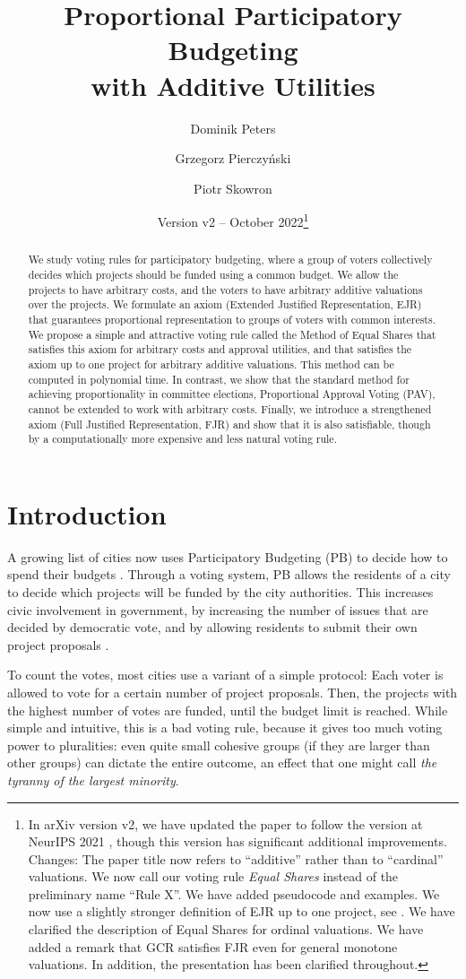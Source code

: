 \documentclass[10pt]{scrartcl}
\title{{\huge\sffamily Proportional Participatory Budgeting \\ with Additive Utilities}}
\author[1]{Dominik Peters}
\author[2]{Grzegorz Pierczy\'{n}ski}
\author[2]{Piotr Skowron}
\affil[1]{CNRS, LAMSADE, Universit\'e Paris Dauphine--PSL, \texttt{dominik.peters@lamsade.dauphine.fr}}
\affil[2]{University of Warsaw, $\{$\texttt{g.pierczynski,p.skowron}$\}$\texttt{@mimuw.edu.pl}}
\date{Version v2 -- October 2022\thanks{In arXiv version v2, we have updated the paper to follow the version at NeurIPS 2021 \citep{peters2021neurips}, though this version has significant additional improvements. Changes: The paper title now refers to ``additive'' rather than to ``cardinal'' valuations. We now call our voting rule \emph{Equal Shares} instead of the preliminary name ``Rule X''. We have added pseudocode and examples. We now use a slightly stronger definition of EJR up to one project, see \Cref{fn:ejr-counterexamples}. We have clarified the description of Equal Shares for ordinal valuations. We have added a remark that GCR satisfies FJR even for general monotone valuations. In addition, the presentation has been clarified throughout.}}
\newcommand{\myemph}[1]{{\color{winered}\emph{#1}}}
\theoremstyle{definition}
\theoremstyle{plain}
\begin{document}
	
	\maketitle
	
	


\begin{abstract}
We study voting rules for participatory budgeting, where a group of voters collectively decides which projects should be funded using a common budget. We allow the projects to have arbitrary costs, and the voters to have arbitrary additive valuations over the projects. We formulate an axiom (Extended Justified Representation, EJR) that guarantees proportional representation to groups of voters with common interests. We propose a simple and attractive voting rule called the Method of Equal Shares that satisfies this axiom for arbitrary costs and approval utilities, and that satisfies the axiom up to one project for arbitrary additive valuations. This method can be computed in polynomial time. In contrast, we show that the standard method for achieving proportionality in committee elections, Proportional Approval Voting (PAV), cannot be extended to work with arbitrary costs. Finally, we introduce a strengthened axiom (Full Justified Representation, FJR) and show that it is also satisfiable, though by a computationally more expensive and less natural voting rule. 
\end{abstract}

\section{Introduction}
A growing list of cities now uses Participatory Budgeting (PB) to decide how to spend their budgets \citep{de2021international,wampler2021participatory}. Through a voting system, PB allows the residents of a city to decide which projects will be funded by the city authorities. This increases civic involvement in government, by increasing the number of issues that are decided by democratic vote, and by allowing residents to submit their own project proposals \citep{participatoryBudgeting,aziz2020participatory}. 

To count the votes, most cities use a variant of a simple protocol: Each voter is allowed to vote for a certain number of project proposals. Then, the projects with the highest number of votes are funded, until the budget limit is reached. While simple and intuitive, this is a bad voting rule, because it gives too much voting power to pluralities: even quite small cohesive groups (if they are larger than other groups) can dictate the entire outcome, an effect that one might call \myemph{the tyranny of the largest minority}. 
\end{document}
